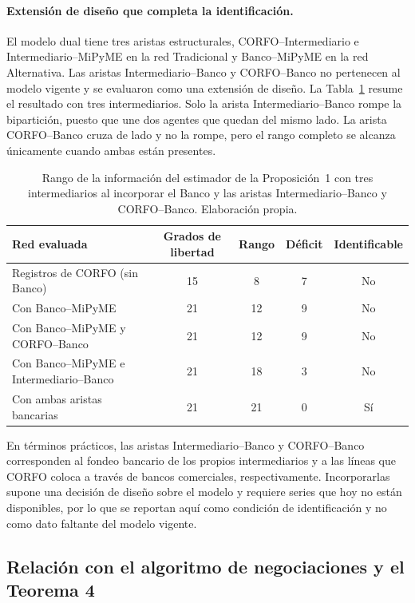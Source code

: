 \paragraph{Extensión de diseño que completa la identificación.}
El modelo dual tiene tres aristas estructurales, CORFO--Intermediario e Intermediario--MiPyME en la red Tradicional y Banco--MiPyME en la red Alternativa. Las aristas Intermediario--Banco y CORFO--Banco no pertenecen al modelo vigente y se evaluaron como una extensión de diseño. La Tabla~\ref{tab:rango-extension} resume el resultado con tres intermediarios. Solo la arista Intermediario--Banco rompe la bipartición, puesto que une dos agentes que quedan del mismo lado. La arista CORFO--Banco cruza de lado y no la rompe, pero el rango completo se alcanza únicamente cuando ambas están presentes.

\begin{table}[htbp]
\centering
\caption[Rango de identificación con aristas bancarias adicionales]{Rango de la información del estimador de la Proposición~1 con tres intermediarios al incorporar el Banco y las aristas Intermediario--Banco y CORFO--Banco. Elaboración propia.}
\label{tab:rango-extension}
\small
\begin{tabular}{lcccc}
\hline
Red evaluada & Grados de libertad & Rango & Déficit & Identificable \\
\hline
Registros de CORFO (sin Banco)             & 15 & 8  & 7 & No \\
Con Banco--MiPyME                          & 21 & 12 & 9 & No \\
Con Banco--MiPyME y CORFO--Banco           & 21 & 12 & 9 & No \\
Con Banco--MiPyME e Intermediario--Banco  & 21 & 18 & 3 & No \\
Con ambas aristas bancarias                & 21 & 21 & 0 & Sí \\
\hline
\end{tabular}
\end{table}

En términos prácticos, las aristas Intermediario--Banco y CORFO--Banco corresponden al fondeo bancario de los propios intermediarios y a las líneas que CORFO coloca a través de bancos comerciales, respectivamente. Incorporarlas supone una decisión de diseño sobre el modelo y requiere series que hoy no están disponibles, por lo que se reportan aquí como condición de identificación y no como dato faltante del modelo vigente.

\subsection{Relación con el algoritmo de negociaciones y el Teorema 4}
\label{c3:algoritmo1-aplicado}

